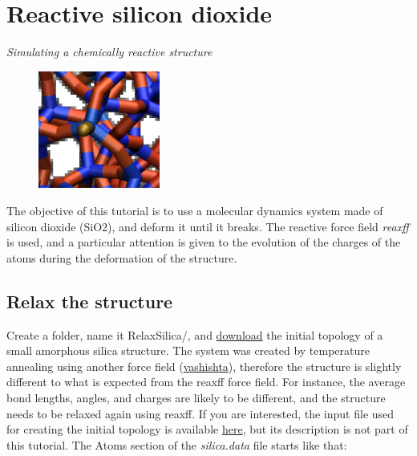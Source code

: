 \chapter{Reactive silicon dioxide}

\vspace{-1cm} \noindent \textcolor{graytitle}{\textit{{\Large Simulating a chemically reactive structure}}\vspace{0.5cm} }

\noindent \hspace{-0.45cm}\begin{figure}
\includegraphics[width=4cm]{tutorials/level3/reactive-silicon-dioxide/SiO_gif_light.png}
\end{figure}

\noindent The objective of this tutorial is to use a molecular
dynamics system made of silicon dioxide (SiO2), and deform 
it until it breaks. The reactive force field \textit{reaxff} is used, and 
a particular attention is given to the evolution of the charges
of the atoms during the deformation of the structure. 

\section{Relax the structure}

\noindent Create a folder, name it RelaxSilica/, and \href{../../../../../inputs/level3/reactive-silicon-dioxide/RelaxSilica/silica.data}{download}
the initial topology of a small amorphous silica structure.
The system was created by temperature annealing using another force field 
(\href{../../../../../inputs/level3/reactive-silicon-dioxide/CreateSilica/SiO.1990.vashishta}{vashishta}), therefore the structure is slightly
different to what is expected from the reaxff force field. 
For instance, the average bond lengths, angles, and charges 
are likely to be different, and the structure needs 
to be relaxed again using reaxff. 
If you are interested, the input file used for creating the initial topology is 
available \href{../../../../../inputs/level3/reactive-silicon-dioxide/CreateSilica/input.lammps}{here}, but its description is not part of this tutorial.
The Atoms section of the \textit{silica.data} file starts like that:

